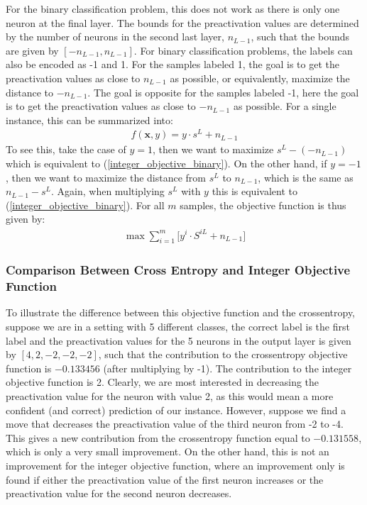 \noindent For the binary classification problem, this does not work as there is only one neuron at the final layer. The bounds for the preactivation values are determined by the number of neurons in the second last layer, $n_{L-1}$, such that the bounds are given by $[-n_{L-1}, n_{L-1}]$. For binary classification problems, the labels can also be encoded as -1 and 1. For the samples labeled 1, the goal is to get the preactivation values as close to $n_{L-1}$ as possible, or equivalently, maximize the distance to $-n_{L-1}$. The goal is opposite for the samples labeled -1, here the goal is to get the preactivation values as close to $-n_{L-1}$ as possible. For a single instance, this can be summarized into:
\begin{align}
    \label{integer_objective_binary} f(\mathbf{x}, y) = y\cdot s^L + n_{L-1}
\end{align}
To see this, take the case of $y=1$, then we want to maximize $s^L - (-n_{L-1})$ which is equivalent to (\ref{integer_objective_binary}). On the other hand, if $y = -1$, then we want to maximize the distance from $s^L$ to $n_{L-1}$, which is the same as $n_{L-1} - s^L$. Again, when multiplying $s^L$ with $y$ this is equivalent to (\ref{integer_objective_binary}). For all $m$ samples, the objective function is thus given by:
\begin{align}
    \label{int_binary} \max \sum_{i=1} ^m \big[ y^i \cdot S^{iL} + n_{L-1} \big]
\end{align}

\subsubsection{Comparison Between Cross Entropy and Integer Objective Function}
To illustrate the difference between this objective function and the crossentropy, suppose we are in a setting with 5 different classes, the correct label is the first label and the preactivation values for the 5 neurons in the output layer is given by $[4, 2, -2, -2, -2]$, such that the contribution to the crossentropy objective function is $-0.133456$ (after multiplying by -1). The contribution to the integer objective function is 2. Clearly, we are most interested in decreasing the preactivation value for the neuron with value 2, as this would mean a more confident (and correct) prediction of our instance. However, suppose we find a move that decreases the preactivation value of the third neuron from -2 to -4. This gives a new contribution from the crossentropy function equal to $-0.131558$, which is only a very small improvement. On the other hand, this is not an improvement for the integer objective function, where an improvement only is found if either the preactivation value of the first neuron increases or the preactivation value for the second neuron decreases. 

